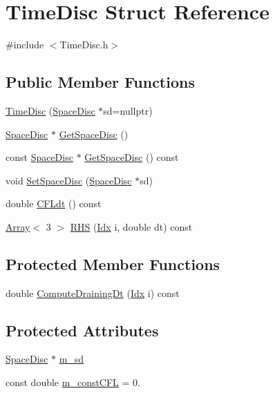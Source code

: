 \hypertarget{structTimeDisc}{}\section{Time\+Disc Struct Reference}
\label{structTimeDisc}


{\ttfamily \#include $<$Time\+Disc.\+h$>$}

\subsection*{Public Member Functions}
\begin{DoxyCompactItemize}
\item 
\hyperlink{structTimeDisc_a9f57c8abaf950c0cb32f83df8470b911}{Time\+Disc} (\hyperlink{structSpaceDisc}{Space\+Disc} $\ast$sd=nullptr)
\item 
\hyperlink{structSpaceDisc}{Space\+Disc} $\ast$ \hyperlink{structTimeDisc_aeff8e840257aa405f1e32ea469312299}{Get\+Space\+Disc} ()
\item 
const \hyperlink{structSpaceDisc}{Space\+Disc} $\ast$ \hyperlink{structTimeDisc_af58702da70c28c0876f0342b627a5c63}{Get\+Space\+Disc} () const
\item 
void \hyperlink{structTimeDisc_a1997626474c730f7167491fd804b8332}{Set\+Space\+Disc} (\hyperlink{structSpaceDisc}{Space\+Disc} $\ast$sd)
\item 
double \hyperlink{structTimeDisc_aabda29cfe58340823c5c3781aeddcd43}{C\+F\+Ldt} () const
\item 
\hyperlink{Includes_8h_abd9de33944f934950000c3929e14ad8d}{Array}$<$ 3 $>$ \hyperlink{structTimeDisc_a4fbce03e40554045b59958fceda7814d}{R\+HS} (\hyperlink{Includes_8h_ae78891cd308078a2f5f9e7193065c805}{Idx} i, double dt) const
\end{DoxyCompactItemize}
\subsection*{Protected Member Functions}
\begin{DoxyCompactItemize}
\item 
double \hyperlink{structTimeDisc_aa3ede7163c05fc76a6779306bc284875}{Compute\+Draining\+Dt} (\hyperlink{Includes_8h_ae78891cd308078a2f5f9e7193065c805}{Idx} i) const
\end{DoxyCompactItemize}
\subsection*{Protected Attributes}
\begin{DoxyCompactItemize}
\item 
\hyperlink{structSpaceDisc}{Space\+Disc} $\ast$ \hyperlink{structTimeDisc_af66d1003243d283ec075c2b69a795246}{m\+\_\+sd}
\item 
const double \hyperlink{structTimeDisc_a474cf65ec7cb4e8dc6367ea8ddc9ac7e}{m\+\_\+const\+C\+FL} = 0.
\end{DoxyCompactItemize}


